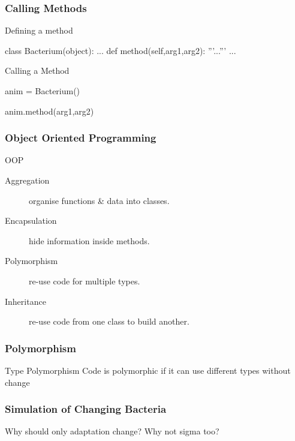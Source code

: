 \begin{frame}[fragile]
\frametitle{Calling Methods}

\begin{block}{Defining a method}
\begin{python}
class Bacterium(object):
    ...
    def method(self,arg1,arg2):
        '''...'''
        ...
\end{python}
\end{block}

\begin{block}{Calling a Method}
\begin{python}
anim = Bacterium()

anim.method(arg1,arg2)
\end{python}
\end{block}
\end{frame}

\begin{frame}[fragile] 
\frametitle{Object Oriented Programming}

\begin{block}{OOP}
\begin{description}
\item[\alert{Aggregation}] organise functions \& data into classes.
\item[\alert{Encapsulation}] hide information inside methods.
\item[Polymorphism] re-use code for multiple types.
\item[Inheritance] re-use code from one class to build another.
\end{description}
\end{block}
\end{frame}

\begin{frame}[fragile] 
\frametitle{Polymorphism}

\begin{block}{Type Polymorphism}
Code is \alert{polymorphic} if it can use different types without change
\end{block}

\end{frame}

\begin{frame}[fragile]
\frametitle{Simulation of Changing Bacteria}

Why should only adaptation change? Why not \alert{sigma} too?

\end{frame}

